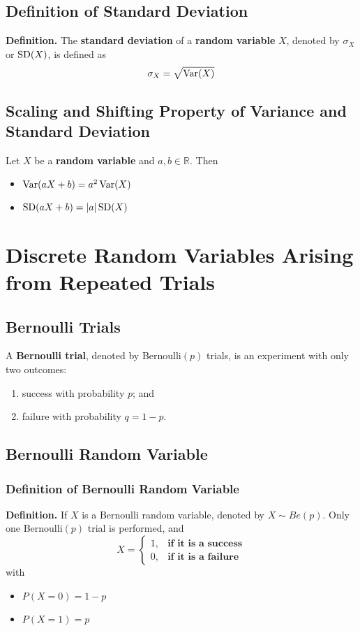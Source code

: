 \documentclass[../st2131_notes.tex]{subfiles}
\begin{document}
\subsection{Definition of Standard Deviation}
\textbf{Definition.} The \textbf{standard deviation} of a \textbf{random variable} \(X\), denoted by \(\sigma_X\) or \(\operatorname{SD}(X)\), is defined as
\[\sigma_X=\sqrt{\operatorname{Var}(X)}\]

\subsection{Scaling and Shifting Property of Variance and Standard Deviation}
Let \(X\) be a \textbf{random variable} and \(a,b\in\mathbb{R}\). Then
\begin{itemize}
	\item\(\operatorname{Var}(aX+b)=a^2\operatorname{Var}(X)\)
	\item\(\operatorname{SD}(aX+b)=\lvert a\rvert\operatorname{SD}(X)\)
\end{itemize}

\section{Discrete Random Variables Arising from Repeated Trials}
\subsection{Bernoulli Trials}
A \textbf{Bernoulli trial}, denoted by Bernoulli\((p)\) trials, is an experiment with only two outcomes:
\begin{enumerate}
	\item success with probability \(p\); and
	\item failure with probability \(q=1-p\).
\end{enumerate}

\subsection{Bernoulli Random Variable}
\subsubsection{Definition of Bernoulli Random Variable}
\textbf{Definition.} If \(X\) is a Bernoulli random variable, denoted by \(X\sim Be(p)\). Only one Bernoulli\((p)\) trial is performed, and
\[X=\begin{cases}
	1, & \textbf{if it is a success} \\
	0, & \textbf{if it is a failure}
\end{cases}\]
with
\begin{itemize}
	\item\(P(X=0)=1-p\)
	\item\(P(X=1)=p\)
\end{itemize}
\end{document}
